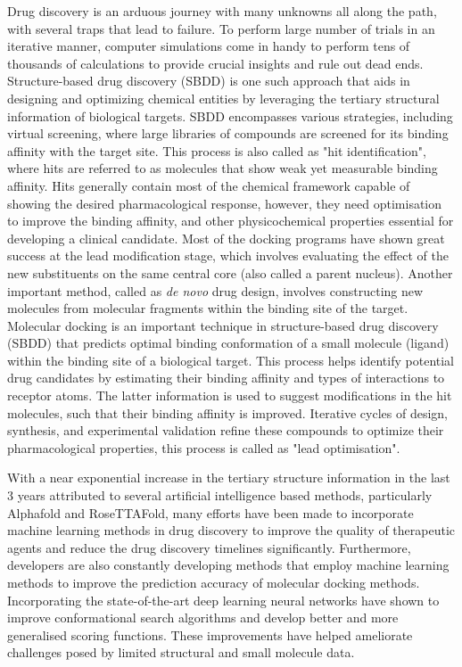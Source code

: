 %
Drug discovery\cite{bib32} is an arduous journey with many unknowns all along the path, with several traps that lead to failure. To perform large number of trials in an iterative manner, computer simulations\cite{bib33, bib34} come in handy to perform tens of thousands of calculations to provide crucial insights and rule out dead ends. Structure-based drug discovery (SBDD) is one such approach that aids in designing and optimizing chemical entities by leveraging the tertiary structural information of biological targets. SBDD encompasses various strategies, including virtual screening, where large libraries of compounds are screened for its binding affinity with the target site. This process is also called as "hit identification", where hits are referred to as molecules that show weak yet measurable binding affinity. Hits generally contain most of the chemical framework capable of showing the desired pharmacological response, however, they need optimisation to improve the binding affinity, and other physicochemical properties essential for developing a clinical candidate. Most of the docking programs have shown great success at the lead modification stage, which involves evaluating the effect of the new substituents on the same central core (also called a parent nucleus)\cite{bib53}. 
Another important method, called as \textit{de novo} drug design, involves constructing new molecules from molecular fragments within the binding site of the target.  Molecular docking\cite{bib35} is an important technique in structure-based drug discovery (SBDD) that predicts optimal binding conformation of a small molecule (ligand) within the binding site of a biological target. This process helps identify potential drug candidates by estimating their binding affinity and types of interactions to receptor atoms. The latter information is used to suggest modifications in the hit molecules, such that their binding affinity is improved. Iterative cycles of design, synthesis, and experimental validation refine these compounds to optimize their pharmacological properties, this process is called as "lead optimisation". 

With a near exponential increase in the tertiary structure information in the last 3 years attributed to several artificial intelligence based methods, particularly Alphafold\cite{bib37} and RoseTTAFold\cite{bib38}, many efforts have been made to incorporate machine learning methods in drug discovery to improve the quality of therapeutic agents and reduce the drug discovery timelines significantly\cite{bib36}. Furthermore, developers are also constantly developing methods that employ machine learning methods to improve the prediction accuracy of molecular docking methods. Incorporating the state-of-the-art deep learning neural networks have shown to improve conformational search algorithms and develop better and more generalised scoring functions. These improvements have helped ameliorate challenges posed by limited structural and small molecule data\cite{bib39, bib40}. 


